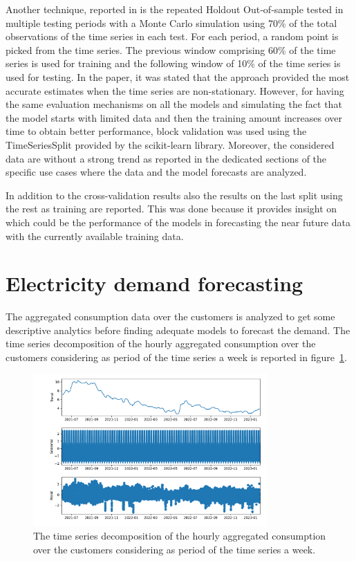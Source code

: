 Another technique, reported in \cite{Cerqueira2020} is the repeated Holdout Out‐of‐sample tested in multiple testing periods with a Monte Carlo simulation using 70\% of the total observations of the time series in each test.
For each period, a random point is picked from the time series.
The previous window comprising 60\% of the time series is used for training and the following window of 10\% of the time series is used for testing.
In the paper, it was stated that the approach provided the most accurate estimates when the time series are non-stationary.
However, for having the same evaluation mechanisms on all the models and simulating the fact that the model starts with limited data and then the training amount increases over time to obtain better performance, block validation was used using the TimeSeriesSplit provided by the scikit-learn library.
Moreover, the considered data are without a strong trend as reported in the dedicated sections of the specific use cases where the data and the model forecasts are analyzed.

In addition to the cross-validation results also the results on the last split using the rest as training are reported.
This was done because it provides insight on which could be the performance of the models in forecasting the near future data with the currently available training data.


\section{Electricity demand forecasting}
\label{sec:demandval}
\vspace{0.2 cm}

The aggregated consumption data over the customers is analyzed to get some descriptive analytics before finding adequate models to forecast the demand.
The time series decomposition of the hourly aggregated consumption over the customers considering as period of the time series a week is reported in figure~\ref{fig:demanddecomposition}. %

\begin{figure}[H]
\centering
\includegraphics[width=0.8\textwidth]{images/demand/hourly_decomposition_week_period}
\caption{The time series decomposition of the hourly aggregated consumption over the customers considering as period of the time series a week.}
\label{fig:demanddecomposition}
\end{figure}

